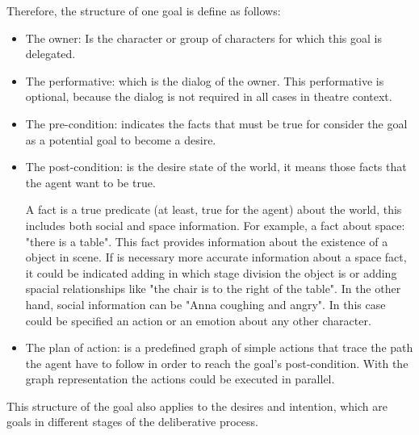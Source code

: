 Therefore, the structure of one goal is define as follows:
\begin{itemize}

\item The owner: Is the character or group of characters for which this goal is delegated.

\item The performative: which is the dialog of the owner. This performative is optional, because the dialog is not required in all cases in theatre context.

\item The pre-condition: indicates the facts that must be true for consider the goal as a potential goal to become a desire.

\item The post-condition: is the desire state of the world, it means those facts that the agent want to be true.

A fact is a true predicate (at least, true for the agent) about the world, this includes both social and space information. For example, a fact about space: "there is a table". This fact provides information about the existence of a object in scene. If is necessary more accurate information about a space fact, it could be indicated adding in which stage division the object is or adding spacial relationships like "the chair is to the right of the table". In the other hand, social information can be "Anna coughing and angry". In this case could be specified an action or an emotion about any other character.

\item The plan of action: is a predefined graph of simple actions that trace the path the agent have to follow in order to reach the goal's post-condition. With the graph representation the actions could be executed in parallel. 
\end{itemize}
This structure of the goal also applies to the desires and intention, which are goals in different stages of the deliberative process. 
